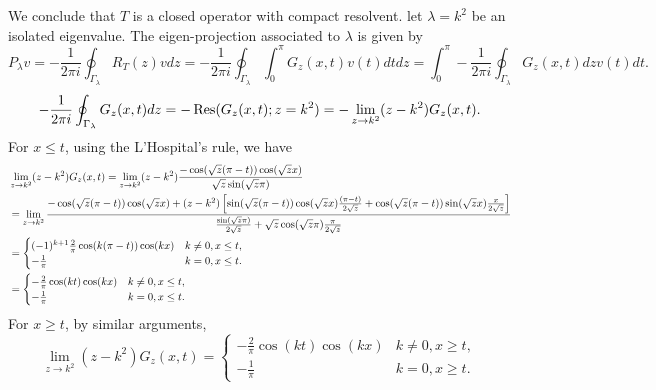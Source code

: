 \begin{example}
    We conclude that $T$ is a closed operator with compact resolvent. 
    let $\lambda = k^2$ be an isolated eigenvalue. The 
    eigen-projection associated to $\lambda$ is given by 
    \begin{equation*}
        P_\lambda v = -\frac{1}{2\pi i}\oint_{\Gamma_\lambda} R_T(z)vdz
        = -\frac{1}{2\pi i}\oint_{\Gamma_\lambda} \int_0^\pi G_z(x,t)v(t)dt dz
        = \int_0^\pi -\frac{1}{2\pi i}\oint_{\Gamma_\lambda} G_z(x,t)dz v(t)dt.
    \end{equation*}
    \begin{equation*}
        -\frac{1}{2\pi i}\oint_{\Gamma_\lambda} G_z(x,t)dz = -\operatorname{Res}(G_z(x,t); z=k^2) 
        = -\lim_{z\to k^2} (z-k^2)G_z(x,t).
    \end{equation*}
    For $x\leq t$, using the L'Hospital's rule, we have
    \begin{equation*}
        \begin{split}
            &\lim_{z\to k^2} (z-k^2)G_z(x,t) 
            = \lim_{z\to k^2} (z-k^2)\frac{-\cos(\sqrt{z}(\pi-t))\cos(\sqrt{z}x)}{\sqrt{z}\sin(\sqrt{z}\pi)} \\ 
            &= \lim_{z\to k^2} \frac{-\cos(\sqrt{z}(\pi - t))\cos(\sqrt{z}x) + (z - k^2)\left[ {\sin(\sqrt{z}(\pi - t))\cos(\sqrt{z}x)\frac{(\pi - t)}{2\sqrt{z}} + \cos(\sqrt{z}(\pi - t))\sin(\sqrt{z}x)\frac{x}{2\sqrt{z}}} \right]}{\frac{\sin(\sqrt{z}\pi)}{2\sqrt{z}} + \sqrt{z}\cos(\sqrt{z}\pi)\frac{\pi}{2\sqrt{z}}} \\ 
            &= \begin{cases}
                (-1)^{k+1}\frac{2}{\pi}\cos(k(\pi - t))\cos(kx) & k\neq 0, x\leq t,\\
                -\frac{1}{\pi} & k = 0, x\leq t.
            \end{cases} \\ 
            &= \begin{cases}
                -\frac{2}{\pi}\cos(kt)\cos(kx) & k\neq 0, x\leq t,\\
                -\frac{1}{\pi} & k = 0, x\leq t.
            \end{cases}
        \end{split}
    \end{equation*}
    For $x\geq t$, by similar arguments, 
    \begin{equation*}
        \lim_{z\to k^2} (z-k^2)G_z(x,t) 
        = \begin{cases}
            -\frac{2}{\pi}\cos(kt)\cos(kx) & k\neq 0, x\geq t,\\
            -\frac{1}{\pi} & k = 0, x\geq t.

\end{cases}
\end{equation*}
\end{example}
